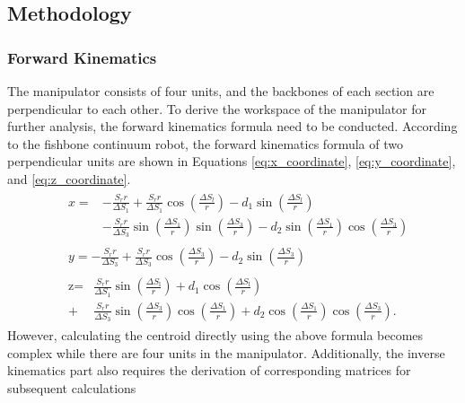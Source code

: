 \subsection{Methodology}
\subsubsection{Forward Kinematics}
The manipulator consists of four units, and the backbones of each section are perpendicular to each other. To derive the 
workspace of the manipulator for further analysis, the forward kinematics formula need to be conducted. According to the 
fishbone continuum robot\cite{fishboneCR}, the forward kinematics formula of two perpendicular units are shown in 
Equations \ref{eq:x_coordinate}, \ref{eq:y_coordinate}, and \ref{eq:z_coordinate}.
\begin{align}
    &\begin{aligned}
    x=&-\frac{S_{r}r}{\Delta S_{1}}+\frac{S_{r}r}{\Delta S_{1}}\cos\left(\frac{\Delta S_{l}}{r}\right)-d_{1}\sin\left(\frac{\Delta S_{l}}{r}\right) \\
    &-\frac{S_{r}r}{\Delta S_{3}}\sin\left(\frac{\Delta S_{1}}{r}\right)\sin\left(\frac{\Delta S_{3}}{r}\right)-d_{2}\sin\left(\frac{\Delta S_{1}}{r}\right)\cos\left(\frac{\Delta S_{3}}{r}\right) 
    \end{aligned}
    \label{eq:x_coordinate} \\
    &\begin{aligned}
        y=-\frac{S_rr}{\Delta S_3}+\frac{S_rr}{\Delta S_3}\cos\left(\frac{\Delta S_3}{r}\right)-d_2\sin\left(\frac{\Delta S_3}{r}\right)
    \end{aligned}
    \label{eq:y_coordinate} \\
    &\begin{aligned}
        \text{z} =&\frac{S_{r}r}{\Delta S_{1}}\sin\left(\frac{\Delta S_{\mathrm{l}}}{r}\right)+d_{1}\cos\left(\frac{\Delta S_{\mathrm{l}}}{r}\right) \\
        +&\frac{S_{r}r}{\Delta S_{3}}\sin\left(\frac{\Delta S_{3}}{r}\right)\cos\left(\frac{\Delta S_{1}}{r}\right)+d_{2}\cos\left(\frac{\Delta S_{1}}{r}\right)\cos\left(\frac{\Delta S_{3}}{r}\right). 
    \end{aligned}
    \label{eq:z_coordinate}
\end{align}
However, calculating the centroid directly using the above formula becomes complex while there are four units in the manipulator. 
Additionally, the inverse kinematics part also requires the derivation of corresponding matrices for subsequent calculations 
